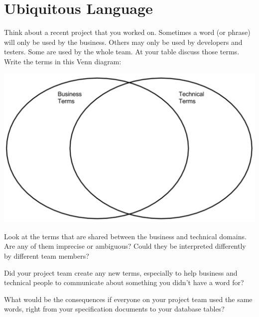 \chapter*{Ubiquitous Language}

Think about a recent project that you worked on. Sometimes a word (or phrase) will only be used by the business. Others may only be used by developers and testers. Some are used by the whole team.
At your table discuss those terms. Write the terms in this Venn diagram:

\includegraphics[width=\textwidth]{images/ubiquitous-venn}

Look at the terms that are shared between the business and technical domains. Are any of them imprecise or ambiguous? Could they be interpreted differently by different team members?


Did your project team create any new terms, especially to help business and technical people to communicate about something you didn't have a word for?


What would be the consequences if everyone on your project team used the same words, right from your specification documents to your database tables?

